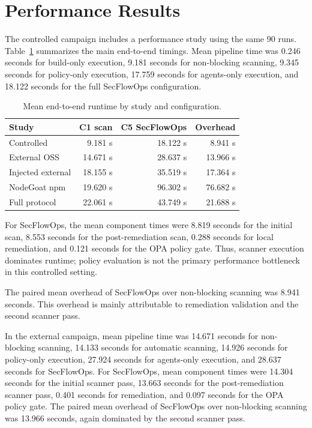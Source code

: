 \section{Performance Results}

The controlled campaign includes a performance study using the same 90 runs. Table~\ref{tab:performance-summary} summarizes the main end-to-end timings. Mean pipeline time was 0.246 seconds for build-only execution, 9.181 seconds for non-blocking scanning, 9.345 seconds for policy-only execution, 17.759 seconds for agents-only execution, and 18.122 seconds for the full SecFlowOps configuration.

\begin{table}[t]
\centering
\caption{Mean end-to-end runtime by study and configuration.}
\label{tab:performance-summary}
\begin{tabular}{lrrr}
\toprule
Study & C1 scan & C5 SecFlowOps & Overhead \\
\midrule
Controlled & 9.181 s & 18.122 s & 8.941 s \\
External OSS & 14.671 s & 28.637 s & 13.966 s \\
Injected external & 18.155 s & 35.519 s & 17.364 s \\
NodeGoat npm & 19.620 s & 96.302 s & 76.682 s \\
Full protocol & 22.061 s & 43.749 s & 21.688 s \\
\bottomrule
\end{tabular}
\end{table}

For SecFlowOps, the mean component times were 8.819 seconds for the initial scan, 8.553 seconds for the post-remediation scan, 0.288 seconds for local remediation, and 0.121 seconds for the OPA policy gate. Thus, scanner execution dominates runtime; policy evaluation is not the primary performance bottleneck in this controlled setting.

The paired mean overhead of SecFlowOps over non-blocking scanning was 8.941 seconds. This overhead is mainly attributable to remediation validation and the second scanner pass.

In the external campaign, mean pipeline time was 14.671 seconds for non-blocking scanning, 14.133 seconds for automatic scanning, 14.926 seconds for policy-only execution, 27.924 seconds for agents-only execution, and 28.637 seconds for SecFlowOps. For SecFlowOps, mean component times were 14.304 seconds for the initial scanner pass, 13.663 seconds for the post-remediation scanner pass, 0.401 seconds for remediation, and 0.097 seconds for the OPA policy gate. The paired mean overhead of SecFlowOps over non-blocking scanning was 13.966 seconds, again dominated by the second scanner pass.

